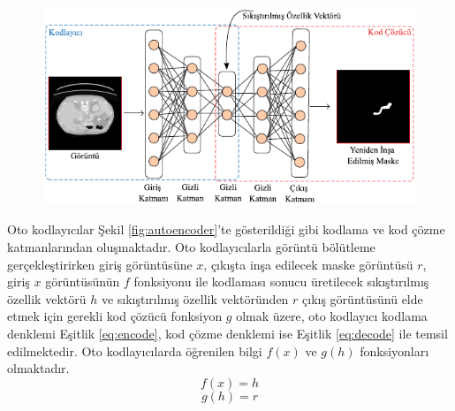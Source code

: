\begin{figure}[h!]
	\begin{center}
		\vspace{0.4cm}
		{
			\vspace{0.4cm}
			\includegraphics[scale=1.6]{Yapilan-Calismalar/Figures/autoencoder.pdf}
		}
	\end{center}
\end{figure}

Oto kodlayıcılar Şekil \ref{fig:autoencoder}'te gösterildiği gibi kodlama ve kod çözme katmanlarından oluşmaktadır. Oto kodlayıcılarla görüntü bölütleme gerçekleştirirken giriş görüntüsüne $x$, çıkışta inşa edilecek maske görüntüsü $r$, giriş $x$ görüntüsünün $f$ fonksiyonu ile kodlaması sonucu üretilecek sıkıştırılmış özellik vektörü $h$ ve sıkıştırılmış özellik vektöründen $r$ çıkış görüntüsünü elde etmek için gerekli kod çözücü fonksiyon $g$ olmak üzere, oto kodlayıcı kodlama denklemi Eşitlik \ref{eq:encode}, kod çözme denklemi ise Eşitlik \ref{eq:decode} ile temsil edilmektedir. Oto kodlayıcılarda öğrenilen bilgi $f(x)$ ve $g(h)$ fonksiyonları olmaktadır.
\begin{equation}
	\label{eq:encode}
	f(x)=h
\end{equation}
\vspace{-1.5cm}
\begin{equation}
	\label{eq:decode}
	g(h)=r
\end{equation}

